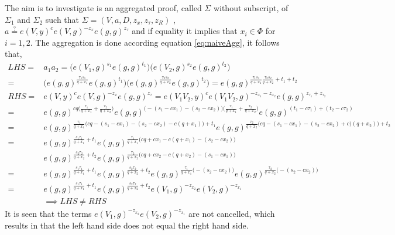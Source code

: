 The aim is to investigate is an aggregated proof, called $\Sigma$ without subscript, of $\Sigma_1$ and $\Sigma_2$ such that $\Sigma=(V,a,D,z_x, z_\tau, z_R)$ ,$a \overset{?}{=} e(V,y)^c e(V,g)^{-z_x}e(g,g)^{z_\tau}$ and if equality it implies that $x_i\in\Phi$ for $i=1,2$. 
The aggregation is done  according equation \eqref{eq:naiveAgg}, it follows that,
\begin{align*}
LHS =& a_1a_2 =\Big( e(V_1,g)^{s_1}e(g,g)^{t_1}   \Big) \Big( e(V_2,g)^{s_2}e(g,g)^{t_2}   \Big)\\
 =&  \Big( e(g,g)^{\frac{\tau_1 s_1}{q+x_1}}e(g,g)^{t_1}   \Big)   \Big( e(g,g)^{\frac{\tau_2 s_2}{q+x_2}}e(g,g)^{t_2}   \Big)  = e(g,g) ^{\frac{\tau_1 s_1}{q+x_1} \frac{\tau_2 s_2}{q+x_2} +t_1+t_2} \\
RHS = &e(V,y)^ce(V,g)^{-z_x}e(g,g)^{z_\tau}  = e(V_1V_2,y)^ce(V_1V_2,g)^{-z_{x_1}- z_{x_2}}e(g,g)^{z_\tau_1+z_\tau_2} \\
=& e(g,g)^{cq \big (  \frac{\tau_1}{q+x_1} + \frac{\tau_2}{q+x_2}\big) } e(g,g)^{ \big(-(s_1- c x_1) - (s_2 - c x_2)  \big) \big (  \frac{\tau_1}{q+x_1} + \frac{\tau_2}{q+x_2}\big) } e(g,g)^{ (t_1- c \tau_1) +(t_2- c \tau_2)} \\
 = & e(g,g)^{ \frac{\tau_1}{q+x_1} \Big(  cq- (s_1-cx_1) -(s_2-cx_2) -c(q+x_1) \Big)+ t_1 }  e(g,g)^{ \frac{\tau_2}{q+x_2} \Big(  cq - (s_1-cx_1)- (s_2-cx_2) + c)(q+x_2) \Big)+ t_2 } \\
 = &  e(g,g)^{ \frac{s_1 \tau_1}{q+x_1}+t_1}  e(g,g)^{ \frac{\tau_1}{q+x_1} \Big(  cq + cx_1 - c(q+x_1) - (s_2-cx_2) \Big) }  \\
 &e(g,g)^{ \frac{s_2 \tau_2}{q+x_2} + t_2  }  e(g,g)^{ \frac{\tau_2}{q+x_2} \Big(  cq + cx_2 - c(q+x_2) - (s_1-cx_1) \Big) } \\
 = &  e(g,g)^{ \frac{s_1 \tau_1}{q+x_1}+t_1} e(g,g)^{ \frac{s_2 \tau_2}{q+x_2}+t_2}   e(g,g)^{ \frac{\tau_1}{q+x_1} \Big(  - (s_2-cx_2) \Big) }   e(g,g)^{ \frac{\tau_2}{q+x_2} \Big( - (s_2-cx_2) \Big) } \\
 = &   e(g,g)^{ \frac{s_1 \tau_1}{q+x_1}+t_1} e(g,g)^{ \frac{s_2 \tau_2}{q+x_2}+t_2}   e(V_1,g)^{- z_{x_2} }   e(V_2,g)^{ - z_{x_1} } \\
 & \implies LHS \neq RHS
\end{align*}
It is seen that the terms $e(V_1,g)^{- z_{x_2} }   e(V_2,g)^{ - z_{x_1} }$ are not cancelled, which results in that the left hand side does not equal the right hand side. 



